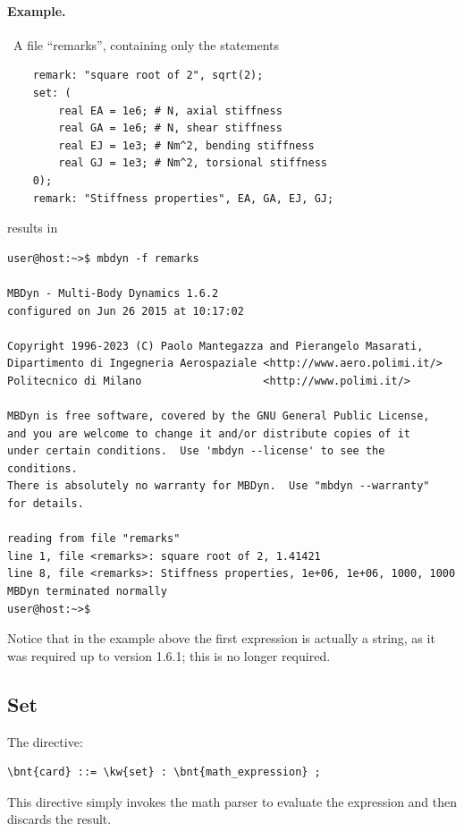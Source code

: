 \paragraph{Example.} \
A file ``remarks'', containing only the statements
\begin{verbatim}
    remark: "square root of 2", sqrt(2);
    set: (
        real EA = 1e6; # N, axial stiffness
        real GA = 1e6; # N, shear stiffness
        real EJ = 1e3; # Nm^2, bending stiffness
        real GJ = 1e3; # Nm^2, torsional stiffness
    0);
    remark: "Stiffness properties", EA, GA, EJ, GJ;
\end{verbatim}
results in
\begin{verbatim}
user@host:~>$ mbdyn -f remarks

MBDyn - Multi-Body Dynamics 1.6.2
configured on Jun 26 2015 at 10:17:02

Copyright 1996-2023 (C) Paolo Mantegazza and Pierangelo Masarati,
Dipartimento di Ingegneria Aerospaziale <http://www.aero.polimi.it/>
Politecnico di Milano                   <http://www.polimi.it/>

MBDyn is free software, covered by the GNU General Public License,
and you are welcome to change it and/or distribute copies of it
under certain conditions.  Use 'mbdyn --license' to see the conditions.
There is absolutely no warranty for MBDyn.  Use "mbdyn --warranty"
for details.

reading from file "remarks"
line 1, file <remarks>: square root of 2, 1.41421
line 8, file <remarks>: Stiffness properties, 1e+06, 1e+06, 1000, 1000
MBDyn terminated normally
user@host:~>$
\end{verbatim}
Notice that in the example above the first expression is actually a string,
as it was required up to version 1.6.1; this is no longer required.

\subsection{Set}
The  directive:
\begin{Verbatim}[commandchars=\\\{\}]
    \bnt{card} ::= \kw{set} : \bnt{math_expression} ;
\end{Verbatim}
This directive simply invokes the math parser to evaluate the expression
\nt{math\_expression} and then discards the result.

